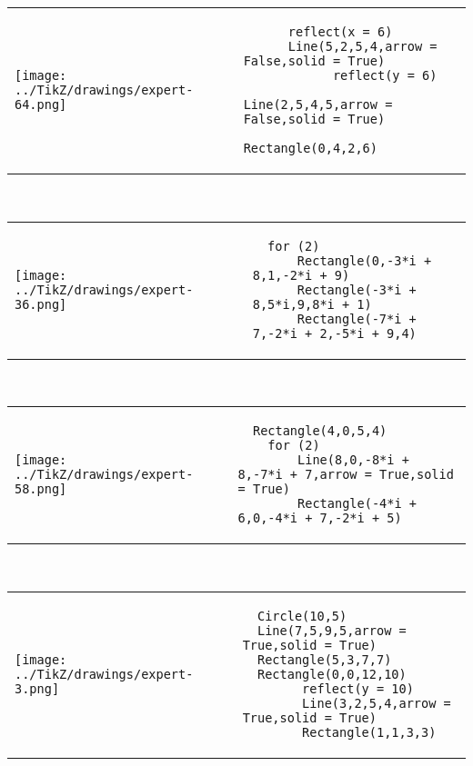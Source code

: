         \begin{tabular}{ll}
\texttt{[image: ../TikZ/drawings/expert-64.png]}&
        \begin{minipage}{10cm}
        \begin{verbatim}
      reflect(x = 6)
      Line(5,2,5,4,arrow = False,solid = True)
            reflect(y = 6)
            Line(2,5,4,5,arrow = False,solid = True)
            Rectangle(0,4,2,6)
        \end{verbatim}
\end{minipage}
\end{tabular}        
        \\

        \begin{tabular}{ll}
\texttt{[image: ../TikZ/drawings/expert-36.png]}&
        \begin{minipage}{10cm}
        \begin{verbatim}
  for (2)
      Rectangle(0,-3*i + 8,1,-2*i + 9)
      Rectangle(-3*i + 8,5*i,9,8*i + 1)
      Rectangle(-7*i + 7,-2*i + 2,-5*i + 9,4)
        \end{verbatim}
\end{minipage}
\end{tabular}        
        \\

        \begin{tabular}{ll}
\texttt{[image: ../TikZ/drawings/expert-58.png]}&
        \begin{minipage}{10cm}
        \begin{verbatim}
  Rectangle(4,0,5,4)
    for (2)
        Line(8,0,-8*i + 8,-7*i + 7,arrow = True,solid = True)
        Rectangle(-4*i + 6,0,-4*i + 7,-2*i + 5)
        \end{verbatim}
\end{minipage}
\end{tabular}        
        \\

        \begin{tabular}{ll}
\texttt{[image: ../TikZ/drawings/expert-3.png]}&
        \begin{minipage}{10cm}
        \begin{verbatim}
  Circle(10,5)
  Line(7,5,9,5,arrow = True,solid = True)
  Rectangle(5,3,7,7)
  Rectangle(0,0,12,10)
        reflect(y = 10)
        Line(3,2,5,4,arrow = True,solid = True)
        Rectangle(1,1,3,3)
        \end{verbatim}
\end{minipage}
\end{tabular}        
        \\

